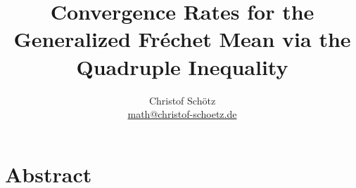\documentclass{scrartcl}
\begin{document}
%
%
%
\title{Convergence Rates for the Generalized Fréchet Mean via the Quadruple Inequality}
\author{Christof Schötz\\\href{mailto:math@christof-schoetz.de}{math@christof-schoetz.de}}
\date{}
%
\maketitle
%
\section*{Abstract}

%
\tableofcontents
%





%

\begin{appendices}

\end{appendices}
%
{}
\printindex[inot]
{}
\printindex[iass]
%
{}
\printbibliography
%
%
%
\end{document}
